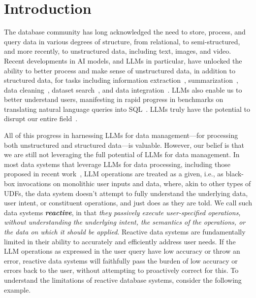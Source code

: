 
\section{Introduction}




The database community has long acknowledged
the need to store, process, and query data
in various degrees of structure,
from relational, to semi-structured, and more recently,
to unstructured data, including text, images, and video.
Recent developments in AI models,
and LLMs in particular, 
have unlocked the ability to better process
and make sense of unstructured data, in addition to structured data, for tasks
including information extraction~\cite{lin2024towards,liu2024declarative}, summarization~\cite{fang2024multi},  data 
cleaning~\cite{Narayan2022CanFM}, 
dataset search~\cite{huang2023fast}, and data integration~\cite{kayali2024mind}.
LLMs also enable us to better understand 
users, 
manifesting in rapid progress in 
benchmarks on translating natural language 
queries into SQL~\cite{li2024dawn,floratou2024nl2sql}.
LLMs truly have the potential to
disrupt our entire field~\cite{llmsdisruptdatamanagement}.


All of this progress in harnessing LLMs for 
data management---for processing both 
unstructured and structured data---is 
valuable. However, our belief is that we 
are still not leveraging the full potential 
of LLMs for data management.
In most data systems
that leverage LLMs for data processing, 
including those proposed in recent 
work~\cite{patel2024lotus,anderson2024designllmpoweredunstructuredanalytics,liu2024declarative},
LLM operations
are treated as a given, 
i.e., as black-box invocations
on monolithic user inputs and data, where,
akin to other types of UDFs, the data system
doesn't attempt to fully understand the
underlying data, user intent, or constituent operations, 
and just does as they are told.
We call such data systems {\em \bf reactive},
in that {\em they passively execute user-specified 
operations, without understanding 
the underlying intent,
the semantics of the operations, 
or the data on which it should be applied}. 
Reactive data systems 
are fundamentally limited in their ability
to accurately and efficiently address
user needs. 
If the LLM operations
as expressed in the user query have low accuracy
or throw an error, reactive data systems
will faithfully pass the burden of low accuracy or
errors back to the user,
without attempting to proactively 
correct for this.
To understand the limitations of reactive database systems, 
consider the following example.


